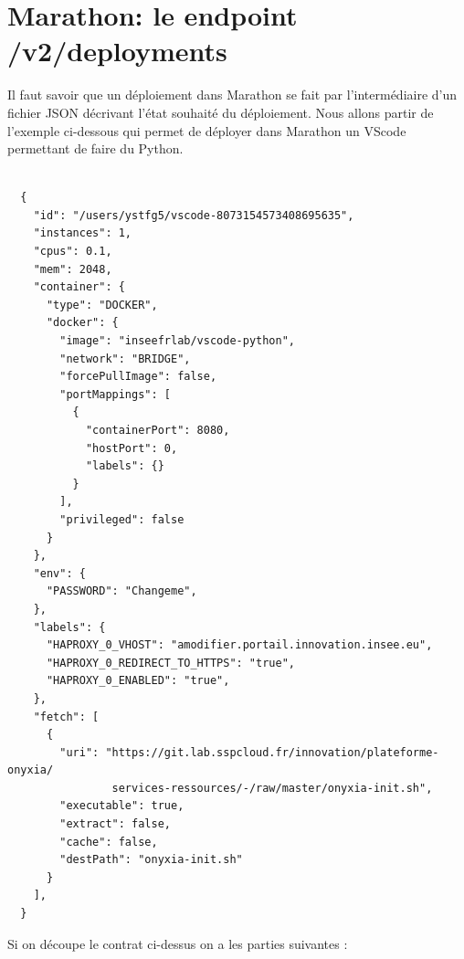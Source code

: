 \documentclass[11pt,fleqn]{book} %
\begin{document}
\section*{Marathon: le endpoint /v2/deployments}
Il faut savoir que un déploiement dans Marathon se fait par l'intermédiaire d'un fichier JSON décrivant l'état souhaité du déploiement. Nous allons partir de l'exemple ci-dessous qui permet de déployer dans Marathon un VScode permettant de faire du Python.
\begin{verbatim}

  {
    "id": "/users/ystfg5/vscode-8073154573408695635",
    "instances": 1,
    "cpus": 0.1,
    "mem": 2048,
    "container": {
      "type": "DOCKER",
      "docker": {
        "image": "inseefrlab/vscode-python",
        "network": "BRIDGE",
        "forcePullImage": false,
        "portMappings": [
          {
            "containerPort": 8080,
            "hostPort": 0,
            "labels": {}
          }
        ],
        "privileged": false
      }
    },
    "env": {
      "PASSWORD": "Changeme",
    },
    "labels": {
      "HAPROXY_0_VHOST": "amodifier.portail.innovation.insee.eu",
      "HAPROXY_0_REDIRECT_TO_HTTPS": "true",
      "HAPROXY_0_ENABLED": "true",
    },
    "fetch": [
      {
        "uri": "https://git.lab.sspcloud.fr/innovation/plateforme-onyxia/
                services-ressources/-/raw/master/onyxia-init.sh",
        "executable": true,
        "extract": false,
        "cache": false,
        "destPath": "onyxia-init.sh"
      }
    ],
  }

\end{verbatim}
Si on découpe le contrat ci-dessus on a les parties suivantes : 
\end{document}
